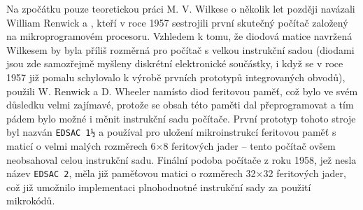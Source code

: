         Na zpočátku pouze teoretickou práci M. V. Wilkese o několik let později navázali William 
        Renwick a \wikiWheeler, kteří v roce 1957 sestrojili první skutečný počítač založený na 
        mikroprogramovém procesoru. Vzhledem k tomu, že diodová matice navržená Wilkesem by byla 
        příliš rozměrná pro počítač s velkou instrukční sadou (diodami jsou zde samozřejmě myšleny 
        diskrétní elektronické součástky, i když se v roce 1957 již pomalu schylovalo k výrobě 
        prvních prototypů integrovaných obvodů), použili W. Renwick a D. Wheeler namísto diod 
        feritovou paměť, což bylo ve svém důsledku velmi zajímavé, protože se obsah této paměti dal 
        přeprogramovat a tím pádem bylo možné i měnit instrukční sadu počítače. První prototyp 
        tohoto stroje byl nazván \texttt{EDSAC 1½} a používal pro uložení mikroinstrukcí feritovou 
        paměť s maticí o velmi malých rozměrech 6×8 feritových jader – tento počítač ovšem 
        neobsahoval celou instrukční sadu. Finální podoba počítače z roku 1958, jež nesla název 
        \texttt{EDSAC 2}, měla již paměťovou matici o rozměrech 32×32 feritových jader, což již 
        umožnilo implementaci plnohodnotné instrukční sady za použití mikrokódů.
    
\printbibliography[title={Seznam literatury}, heading=subbibliography]
